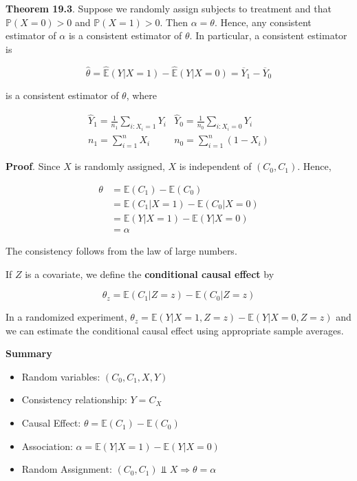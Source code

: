 \textbf{Theorem 19.3}. Suppose we randomly assign subjects to treatment
and that \(\mathbb{P}(X = 0) > 0\) and \(\mathbb{P}(X = 1) > 0\). Then
\(\alpha = \theta\). Hence, any consistent estimator of \(\alpha\) is a
consistent estimator of \(\theta\). In particular, a consistent
estimator is

\[ \hat{\theta} = \hat{\mathbb{E}}(Y | X = 1) - \hat{\mathbb{E}}(Y | X = 0) = \overline{Y}_{1} - \overline{Y}_{0} \]

is a consistent estimator of \(\theta\), where

\[
\begin{array}{ll}
\hat{Y}_{1} = \frac{1}{n_{1}} \sum_{i: X_{i} = 1} Y_{i}
&
\hat{Y}_{0} = \frac{1}{n_{0}} \sum_{i: X_{i} = 0} Y_{i} \\
n_{1} = \sum_{i=1}^{n} X_{i}
&
n_{0} = \sum_{i=1}^{n} (1 - X_{i})
\end{array}
\]

\textbf{Proof}. Since \(X\) is randomly assigned, \(X\) is independent
of \((C_{0}, C_{1})\). Hence,

\begin{align*}
\theta &= \mathbb{E}(C_{1}) - \mathbb{E}(C_{0}) \\
&= \mathbb{E}(C_{1} | X = 1) - \mathbb{E}(C_{0} | X = 0) \\
&= \mathbb{E}(Y | X = 1) - \mathbb{E}(Y | X = 0) \\
&= \alpha
\end{align*}

The consistency follows from the law of large numbers.

If \(Z\) is a covariate, we define the \textbf{conditional causal
effect} by

\[ \theta_z = \mathbb{E}(C_{1} | Z = z) - \mathbb{E}(C_{0} | Z = z) \]

In a randomized experiment,
\(\theta_z = \mathbb{E}(Y | X = 1, Z = z) - \mathbb{E}(Y | X = 0, Z = z)\)
and we can estimate the conditional causal effect using appropriate
sample averages.

\textbf{Summary}

\begin{itemize}[tightlist]
\item
  Random variables: \((C_{0}, C_{1}, X, Y)\)
\item
  Consistency relationship: \(Y = C_X\)
\item
  Causal Effect: \(\theta = \mathbb{E}(C_{1}) - \mathbb{E}(C_{0})\)
\item
  Association:
  \(\alpha = \mathbb{E}(Y | X = 1) - \mathbb{E}(Y | X = 0)\)
\item
  Random Assignment:
  \((C_{0}, C_{1}) \text{ ⫫ } X \Longrightarrow \theta = \alpha\)
\end{itemize}

